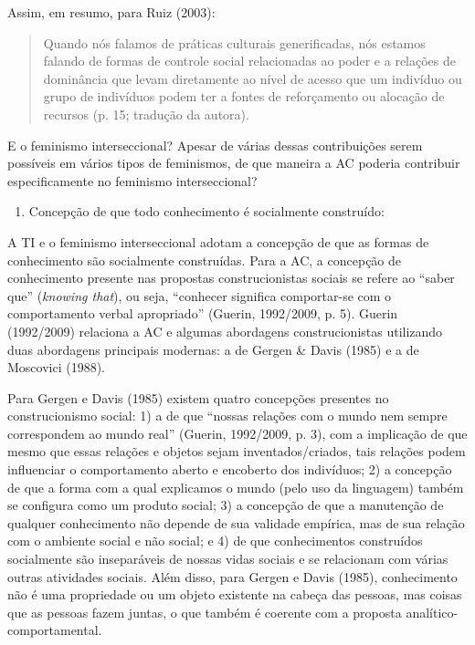 Assim, em resumo, para Ruiz (2003):

\begin{quote}
    Quando nós falamos de práticas culturais generificadas, nós estamos falando de formas de controle social relacionadas ao poder e a relações de dominância que levam diretamente ao nível de acesso que um indivíduo ou grupo de indivíduos podem ter a fontes de reforçamento ou alocação de recursos (p. 15; tradução da autora).
\end{quote}

E o feminismo interseccional? Apesar de várias dessas contribuições serem possíveis em vários tipos de feminismos, de que maneira a AC poderia contribuir especificamente no feminismo interseccional?

\begin{enumerate}
    \item Concepção de que todo conhecimento é socialmente construído:
\end{enumerate}

A TI e o feminismo interseccional adotam a concepção de que as formas de conhecimento são socialmente construídas. Para a AC, a concepção de conhecimento presente nas propostas construcionistas sociais se refere ao ``saber que'' (\textit{knowing that}), ou seja, ``conhecer significa comportar-se com o comportamento verbal apropriado'' (Guerin, 1992/2009, p. 5). Guerin (1992/2009) relaciona a AC e algumas abordagens construcionistas utilizando duas abordagens principais modernas: a de Gergen \& Davis (1985) e a de Moscovici (1988).

Para Gergen e Davis (1985) existem quatro concepções presentes no construcionismo social: 1) a de que ``nossas relações com o mundo nem sempre correspondem ao mundo real'' (Guerin, 1992/2009, p. 3), com a implicação de que mesmo que essas relações e objetos sejam inventados/criados, tais relações podem influenciar o comportamento aberto e encoberto dos indivíduos; 2) a concepção de que a forma com a qual explicamos o mundo (pelo uso da linguagem) também se configura como um produto social; 3) a concepção de que a manutenção de qualquer conhecimento não depende de sua validade empírica, mas de sua relação com o ambiente social e não social; e 4) de que conhecimentos construídos socialmente são inseparáveis de nossas vidas sociais e se relacionam com várias outras atividades sociais. Além disso, para Gergen e Davis (1985), conhecimento não é uma propriedade ou um objeto existente na cabeça das pessoas, mas coisas que as pessoas fazem juntas, o que também é coerente com a proposta analítico-comportamental.

